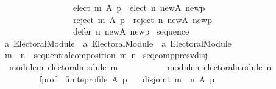 \begin{isabellebody}
\ \ \ \ \ \ \ \ \ \ \ \ \ \ \ \ \ \ {\isacharparenleft}{\kern0pt}elect\ m\ A\ p{\isacharparenright}{\kern0pt}\ {\isasymunion}\ {\isacharparenleft}{\kern0pt}elect\ n\ new{\isacharunderscore}{\kern0pt}A\ new{\isacharunderscore}{\kern0pt}p{\isacharparenright}{\kern0pt}{\isacharcomma}{\kern0pt}\isanewline
\ \ \ \ \ \ \ \ \ \ \ \ \ \ \ \ \ \ {\isacharparenleft}{\kern0pt}reject\ m\ A\ p{\isacharparenright}{\kern0pt}\ {\isasymunion}\ {\isacharparenleft}{\kern0pt}reject\ n\ new{\isacharunderscore}{\kern0pt}A\ new{\isacharunderscore}{\kern0pt}p{\isacharparenright}{\kern0pt}{\isacharcomma}{\kern0pt}\isanewline
\ \ \ \ \ \ \ \ \ \ \ \ \ \ \ \ \ \ defer\ n\ new{\isacharunderscore}{\kern0pt}A\ new{\isacharunderscore}{\kern0pt}p{\isacharparenright}{\kern0pt}{\isacharparenright}{\kern0pt}{\isachardoublequoteclose}\isanewline
\isanewline
{}\isamarkupfalse%
\ sequence\ {\isacharcolon}{\kern0pt}{\isacharcolon}{\kern0pt}\isanewline
\ \ {\isachardoublequoteopen}{\isacharprime}{\kern0pt}a\ Electoral{\isacharunderscore}{\kern0pt}Module\ {\isasymRightarrow}\ {\isacharprime}{\kern0pt}a\ Electoral{\isacharunderscore}{\kern0pt}Module\ {\isasymRightarrow}\ {\isacharprime}{\kern0pt}a\ Electoral{\isacharunderscore}{\kern0pt}Module{\isachardoublequoteclose}\isanewline
\ \ \ \ \ {\isacharparenleft}{\kern0pt}\ {\isachardoublequoteopen}{\isasymtriangleright}{\isachardoublequoteclose}\ {}{}{\isacharparenright}{\kern0pt}\ \isanewline
\ \ {\isachardoublequoteopen}m\ {\isasymtriangleright}\ n\ {\isacharequal}{\kern0pt}{\isacharequal}{\kern0pt}\ sequential{\isacharunderscore}{\kern0pt}composition\ m\ n{\isachardoublequoteclose}\isanewline
\isanewline
{}\isamarkupfalse%
\ seq{\isacharunderscore}{\kern0pt}comp{\isacharunderscore}{\kern0pt}presv{\isacharunderscore}{\kern0pt}disj{\isacharcolon}{\kern0pt}\isanewline
\ \ \ module{\isacharunderscore}{\kern0pt}m{\isacharcolon}{\kern0pt}\ {\isachardoublequoteopen}electoral{\isacharunderscore}{\kern0pt}module\ m{\isachardoublequoteclose}\ \isanewline
\ \ \ \ \ \ \ \ \ \ module{\isacharunderscore}{\kern0pt}n{\isacharcolon}{\kern0pt}\ {\isachardoublequoteopen}electoral{\isacharunderscore}{\kern0pt}module\ n{\isachardoublequoteclose}\ \isanewline
\ \ \ \ \ \ \ \ \ \ f{\isacharunderscore}{\kern0pt}prof{\isacharcolon}{\kern0pt}\ \ {\isachardoublequoteopen}finite{\isacharunderscore}{\kern0pt}profile\ A\ p{\isachardoublequoteclose}\isanewline
\ \ \ {\isachardoublequoteopen}disjoint{}\ {\isacharparenleft}{\kern0pt}{\isacharparenleft}{\kern0pt}m\ {\isasymtriangleright}\ n{\isacharparenright}{\kern0pt}\ A\ p{\isacharparenright}{\kern0pt}{\isachardoublequoteclose}\isanewline

\end{isabellebody}
